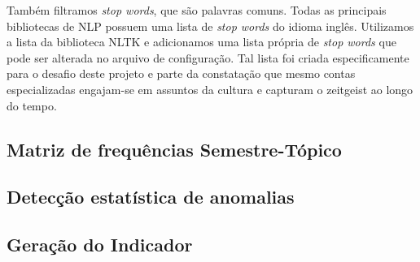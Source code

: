\documentclass[paper=a4, fontsize=11pt]{scrartcl}
\numberwithin{equation}{section}		%
\numberwithin{figure}{section}			%
\numberwithin{table}{section}				%
\begin{document}
Também filtramos \emph{stop words}, que são palavras comuns. Todas as principais bibliotecas de NLP possuem uma lista de \emph{stop words} do idioma inglês. Utilizamos a lista da biblioteca NLTK \citep{nltk} e adicionamos uma lista própria de \emph{stop words} que pode ser alterada no arquivo de configuração. Tal lista foi criada especificamente para o desafio deste projeto e parte da constatação que mesmo contas especializadas engajam-se em assuntos da cultura e capturam o zeitgeist ao longo do tempo.

\subsection{Matriz de frequências Semestre-Tópico}
\subsection{Detecção estatística de anomalias}
\subsection{Geração do Indicador}
\end{document}

